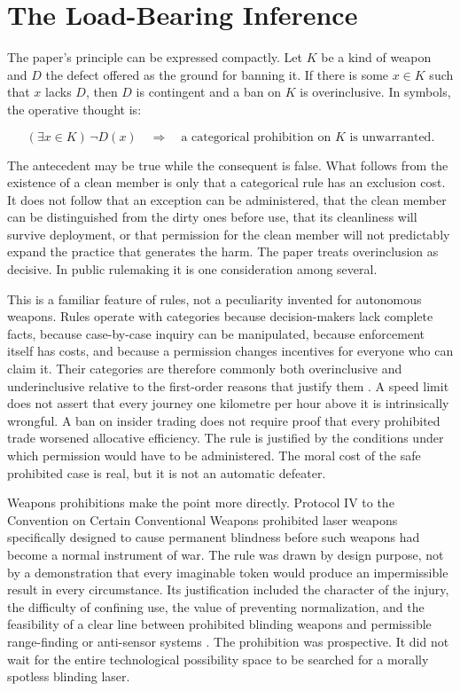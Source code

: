 \documentclass[11pt]{article}
\begin{document}
\section{The Load-Bearing Inference}
\label{sec:inference}

The paper's principle can be expressed compactly. Let $K$ be a kind of weapon and $D$ the defect offered as the ground for banning it. If there is some $x\in K$ such that $x$ lacks $D$, then $D$ is contingent and a ban on $K$ is overinclusive. In symbols, the operative thought is:

\[
(\exists x\in K)\,\neg D(x) \quad \Longrightarrow \quad \text{a categorical prohibition on } K \text{ is unwarranted}.
\]

The antecedent may be true while the consequent is false. What follows from the existence of a clean member is only that a categorical rule has an exclusion cost. It does not follow that an exception can be administered, that the clean member can be distinguished from the dirty ones before use, that its cleanliness will survive deployment, or that permission for the clean member will not predictably expand the practice that generates the harm. The paper treats overinclusion as decisive. In public rulemaking it is one consideration among several.

This is a familiar feature of rules, not a peculiarity invented for autonomous weapons. Rules operate with categories because decision-makers lack complete facts, because case-by-case inquiry can be manipulated, because enforcement itself has costs, and because a permission changes incentives for everyone who can claim it. Their categories are therefore commonly both overinclusive and underinclusive relative to the first-order reasons that justify them \citep{schauer1991}. A speed limit does not assert that every journey one kilometre per hour above it is intrinsically wrongful. A ban on insider trading does not require proof that every prohibited trade worsened allocative efficiency. The rule is justified by the conditions under which permission would have to be administered. The moral cost of the safe prohibited case is real, but it is not an automatic defeater.

Weapons prohibitions make the point more directly. Protocol IV to the Convention on Certain Conventional Weapons prohibited laser weapons specifically designed to cause permanent blindness before such weapons had become a normal instrument of war. The rule was drawn by design purpose, not by a demonstration that every imaginable token would produce an impermissible result in every circumstance. Its justification included the character of the injury, the difficulty of confining use, the value of preventing normalization, and the feasibility of a clear line between prohibited blinding weapons and permissible range-finding or anti-sensor systems \citep{ccw1995, carnahan1996}. The prohibition was prospective. It did not wait for the entire technological possibility space to be searched for a morally spotless blinding laser.
\end{document}
